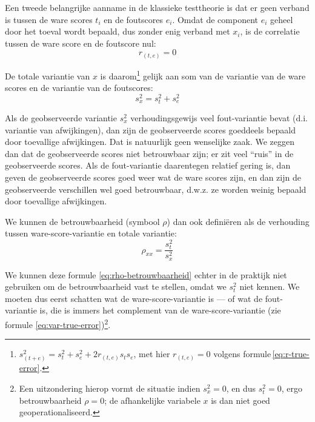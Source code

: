 \documentclass[
]{book}
\begin{document}
Een tweede belangrijke aanname in de klassieke testtheorie is dat er
geen verband is tussen de ware scores \(t_i\) en de foutscores \(e_i\).
Omdat de component \(e_i\) geheel door het toeval wordt bepaald, dus
zonder enig verband met \(x_i\), is de correlatie tussen de ware score en
de foutscore nul:
\begin{equation}
  \label{eq:r-true-error}
  r_{(t,e)} = 0
\end{equation}

De totale variantie van \(x\) is daarom\footnote{\(s^2_{(t+e)} = s^2_t + s^2_e + 2 r_{(t,e)} s_t s_e\), met hier \(r_{(t,e)}=0\) volgens formule \eqref{eq:r-true-error}.} gelijk aan som van de
variantie van de ware scores en de variantie van de foutscores:
\begin{equation}
  \label{eq:var-true-error}
  s^2_x = s^2_t + s^2_e
\end{equation}

Als de geobserveerde variantie \(s^2_x\) verhoudingsgewijs veel
fout-variantie bevat (d.i. variantie van afwijkingen), dan zijn de
geobserveerde scores goeddeels bepaald door toevallige afwijkingen. Dat
is natuurlijk geen wenselijke zaak. We zeggen dan dat de geobserveerde
scores niet betrouwbaar zijn; er zit veel ``ruis'' in de geobserveerde
scores. Als de fout-variantie daarentegen relatief gering is, dan geven
de geobserveerde scores goed weer wat de ware scores zijn, en dan zijn
de geobserveerde verschillen wel goed betrouwbaar, d.w.z. ze worden
weinig bepaald door toevallige afwijkingen.

We kunnen de betrouwbaarheid (symbool \(\rho\)) dan ook definiëren als de
verhouding tussen ware-score-variantie en totale variantie:
\begin{equation}
  \label{eq:rho-betrouwbaarheid}
  \rho_{xx} = \frac{s^2_t}{s^2_x}
\end{equation}

We kunnen deze formule \eqref{eq:rho-betrouwbaarheid} echter in de praktijk niet gebruiken
om de betrouwbaarheid vast te stellen, omdat we \(s^2_t\) niet kennen. We
moeten dus eerst schatten wat de ware-score-variantie is --- of wat de
fout-variantie is, die is immers het complement van de
ware-score-variantie (zie
formule \eqref{eq:var-true-error})\footnote{Een uitzondering hierop vormt de situatie indien \(s^2_x=0\), en dus \(s^2_t=0\), ergo betrouwbaarheid \(\rho=0\); de afhankelijke variabele \(x\) is dan niet goed geoperationaliseerd.}.
\end{document}
